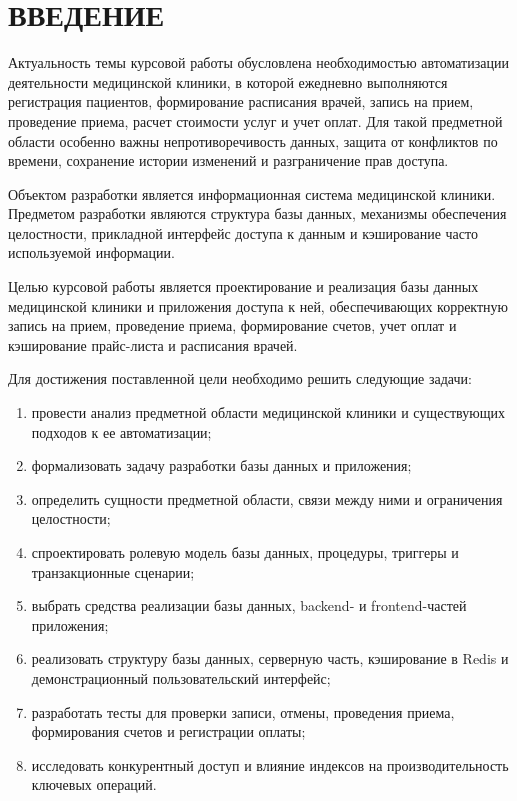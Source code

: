 \chapter*{ВВЕДЕНИЕ}

Актуальность темы курсовой работы обусловлена необходимостью автоматизации деятельности медицинской клиники, в которой ежедневно выполняются регистрация пациентов, формирование расписания врачей, запись на прием, проведение приема, расчет стоимости услуг и учет оплат. Для такой предметной области особенно важны непротиворечивость данных, защита от конфликтов по времени, сохранение истории изменений и разграничение прав доступа.

Объектом разработки является информационная система медицинской клиники. Предметом разработки являются структура базы данных, механизмы обеспечения целостности, прикладной интерфейс доступа к данным и кэширование часто используемой информации.

Целью курсовой работы является проектирование и реализация базы данных медицинской клиники и приложения доступа к ней, обеспечивающих корректную запись на прием, проведение приема, формирование счетов, учет оплат и кэширование прайс-листа и расписания врачей.

Для достижения поставленной цели необходимо решить следующие задачи:
\begin{enumerate}
    \item провести анализ предметной области медицинской клиники и существующих подходов к ее автоматизации;
    \item формализовать задачу разработки базы данных и приложения;
    \item определить сущности предметной области, связи между ними и ограничения целостности;
    \item спроектировать ролевую модель базы данных, процедуры, триггеры и транзакционные сценарии;
    \item выбрать средства реализации базы данных, backend- и frontend-частей приложения;
    \item реализовать структуру базы данных, серверную часть, кэширование в Redis и демонстрационный пользовательский интерфейс;
    \item разработать тесты для проверки записи, отмены, проведения приема, формирования счетов и регистрации оплаты;
    \item исследовать конкурентный доступ и влияние индексов на производительность ключевых операций.
\end{enumerate}

\clearpage
